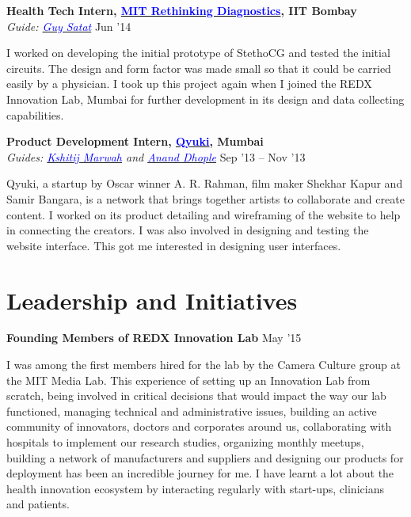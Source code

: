 \documentclass[margin,line]{res}
\newenvironment{list1}{
  \begin{list}{\ding{113}}{%
      \setlength{\itemsep}{0in}
      \setlength{\parsep}{0in} \setlength{\parskip}{0in}
      \setlength{\topsep}{0in} \setlength{\partopsep}{0in} 
      \setlength{\leftmargin}{0.17in}}}{\end{list}}
\begin{document}
\begin{resume}
{\bf Health Tech Intern, \href{https://redxmumbai.wordpress.com/about/}{\textcolor{blue} {MIT Rethinking Diagnostics}}, IIT Bombay} \\
{\em Guide: \href{http://web.media.mit.edu/~guysatat/}{\textcolor{blue}{Guy Satat}}} \hfill {Jun '14} \\
\vspace*{-.13in}
\begin{list1}
\item[]
I worked on developing the initial prototype of StethoCG and tested the initial circuits. The design and form factor was made small so that it could be carried easily by a physician. I took up this project again when I joined the REDX Innovation Lab, Mumbai for further development in its design and data collecting capabilities.
\end{list1}

{\bf Product Development Intern, \href{www.qyuki.com}{\textcolor{blue}{Qyuki}}, Mumbai} \\
{\em Guides: \href{http://www.kshitijmarwah.com}{\textcolor{blue}{Kshitij Marwah}} and \href{https://www.linkedin.com/in/ananddhople}{\textcolor{blue}{Anand Dhople}}} \hfill {Sep '13 -- Nov '13} \\
\vspace*{-.13in}
\begin{list1}
\item[]
Qyuki, a startup by Oscar winner A. R. Rahman, film maker Shekhar Kapur and Samir Bangara, is a network that brings together artists to collaborate and create content. I worked on its product detailing and wireframing of the website to help in connecting the creators. I was also involved in designing and testing the website interface. This got me interested in designing user interfaces. 
\end{list1}

\section{\sc Leadership and Initiatives}

{\bf Founding Members of REDX Innovation Lab} \hfill {May '15} \\
\vspace*{-.13in}
\begin{list1}
\item[]
I was among the first members hired for the lab by the Camera Culture group at the MIT Media Lab. This experience of setting up an Innovation Lab from scratch, being involved in critical decisions that would impact the way our lab functioned, managing technical and administrative issues, building an active community of innovators, doctors and corporates around us, collaborating with hospitals to implement our research studies, organizing monthly meetups, building a network of manufacturers and suppliers and designing our products for deployment has been an incredible journey for me. I have learnt a lot about the health innovation ecosystem by interacting regularly with start-ups, clinicians and patients.
\end{list1}


\end{resume}
\end{document}
